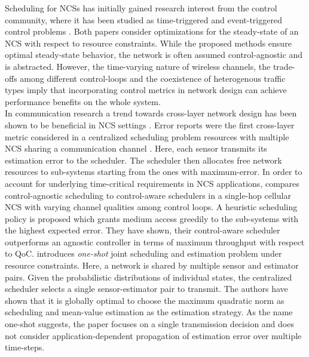 Scheduling for NCSs has initially gained research interest from the control
community, where it has been studied as time-triggered and event-triggered
control problems \cite{molin2012optimality, molin2014price}. Both papers
consider optimizations for the steady-state of an NCS with respect to resource
constraints. While the proposed methods ensure optimal steady-state behavior,
the network is often assumed control-agnostic and is abstracted. However, 
the time-varying nature of wireless channels, the trade-offs among different
control-loops and the coexistence of heterogenous traffic types imply that
incorporating control metrics in network design can achieve performance benefits
on the whole system. \\
In communication research a trend towards cross-layer network design has been
shown to be beneficial in NCS settings \cite{park2017wireless}. Error reports
were the first cross-layer metric considered in a centralized scheduling problem
resources with multiple NCS sharing a communication channel
\cite{walsh2001scheduling}. Here, each sensor transmits its estimation error to
the scheduler. The scheduler then allocates free network resources to
sub-systems starting from the ones with maximum-error. In order to account for
underlying time-critical requirements in NCS applications,
\cite{vilgelm2017control} compares control-agnostic scheduling to control-aware
schedulers in a single-hop cellular NCS with varying channel qualities among
control loops. A heuristic scheduling policy is proposed which grants medium
access greedily to the sub-systems with the highest expected error. They have
shown, their control-aware scheduler outperforms an agnostic controller in terms
of maximum throughput with respect to QoC. \cite{vasconcelos2017optimal}
introduces \textit{one-shot} joint scheduling and estimation problem under
resource constraints. Here, a network is shared by multiple sensor and estimator
pairs. Given the probabilistic distributions of individual states, the
centralized scheduler selects a single sensor-estimator pair to transmit. The
authors have shown that it is globally optimal to choose the maximum quadratic
norm as scheduling and mean-value estimation as the estimation strategy. As the
name one-shot suggests, the paper focuses on a single transmission decision and
does not consider application-dependent propagation of estimation error over
multiple time-steps.

